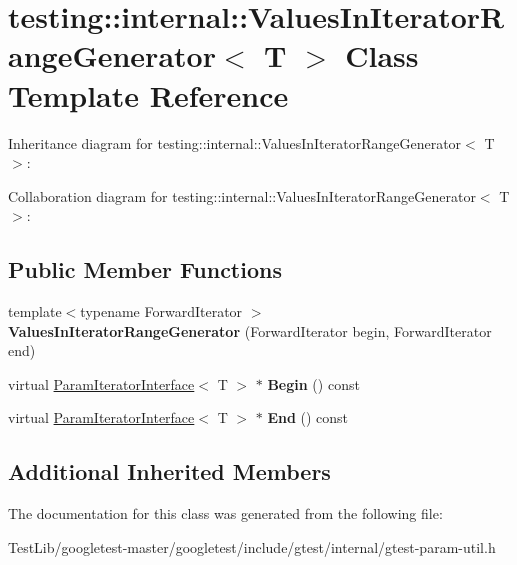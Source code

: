 \hypertarget{classtesting_1_1internal_1_1ValuesInIteratorRangeGenerator}{}\section{testing\+:\+:internal\+:\+:Values\+In\+Iterator\+Range\+Generator$<$ T $>$ Class Template Reference}
\label{classtesting_1_1internal_1_1ValuesInIteratorRangeGenerator}


Inheritance diagram for testing\+:\+:internal\+:\+:Values\+In\+Iterator\+Range\+Generator$<$ T $>$\+:


Collaboration diagram for testing\+:\+:internal\+:\+:Values\+In\+Iterator\+Range\+Generator$<$ T $>$\+:
\subsection*{Public Member Functions}
\begin{DoxyCompactItemize}
\item 
\mbox{\label{classtesting_1_1internal_1_1ValuesInIteratorRangeGenerator_a8b30f6028bc5739bbd7c24b0f0e409f7}} 
{\footnotesize template$<$typename Forward\+Iterator $>$ }\\{\bfseries Values\+In\+Iterator\+Range\+Generator} (Forward\+Iterator begin, Forward\+Iterator end)
\item 
\mbox{\label{classtesting_1_1internal_1_1ValuesInIteratorRangeGenerator_a91dac42f069cd06d05348fe5dd78639b}} 
virtual \hyperlink{classtesting_1_1internal_1_1ParamIteratorInterface}{Param\+Iterator\+Interface}$<$ T $>$ $\ast$ {\bfseries Begin} () const
\item 
\mbox{\label{classtesting_1_1internal_1_1ValuesInIteratorRangeGenerator_a4af95b9eccfc86c40a715df2d9d0df40}} 
virtual \hyperlink{classtesting_1_1internal_1_1ParamIteratorInterface}{Param\+Iterator\+Interface}$<$ T $>$ $\ast$ {\bfseries End} () const
\end{DoxyCompactItemize}
\subsection*{Additional Inherited Members}


The documentation for this class was generated from the following file\+:\begin{DoxyCompactItemize}
\item 
Test\+Lib/googletest-\/master/googletest/include/gtest/internal/gtest-\/param-\/util.\+h\end{DoxyCompactItemize}
